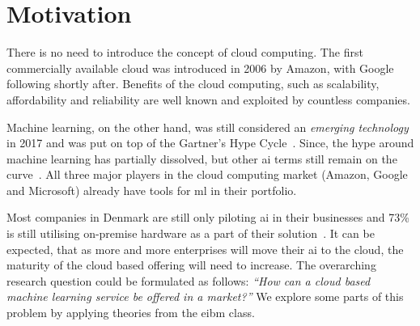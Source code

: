 \section{Motivation}

There is no need to introduce the concept of cloud computing. The first commercially available cloud was introduced in 2006 by Amazon, with Google following shortly after. Benefits of the cloud computing, such as scalability, affordability and reliability are well known and exploited by countless companies.

Machine learning, on the other hand, was still considered an \textit{emerging technology} in 2017 and was put on top of the Gartner's Hype Cycle~\cite{Panetta2017TopTechnologies}. Since, the hype around machine learning has partially dissolved, but other \acrshort{ai} terms still remain on the curve~\cite{Panetta201852018}. All three major players in the cloud computing market (Amazon, Google and Microsoft) already have tools for \acrshort{ml} in their portfolio.

Most companies in Denmark are still only piloting \acrshort{ai} in their businesses and 73\% is still utilising on-premise hardware as a part of their solution~\cite{EY2018ArtificialDenmark}. It can be expected, that as more and more enterprises will move their \acrshort{ai} to the cloud, the maturity of the cloud based offering will need to increase. The overarching research question could be formulated as follows: \textit{``How can a cloud based machine learning service be offered in a market?''} We explore some parts of this problem by applying theories from the \acrshort{eibm} class.